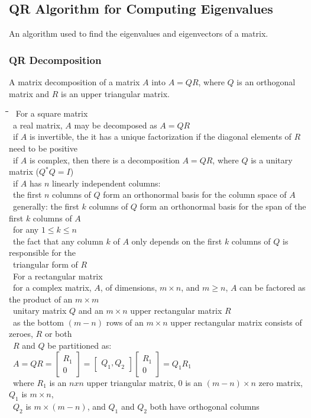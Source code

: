 \documentclass[10pt,letterpaper]{scrartcl}
\newcommand{\tbul}{\textbullet}
\newcommand{\tend}{\>\textendash}
\newcommand{\tasc}{\>\>\textasteriskcentered}
\newcommand{\tpec}{\>\>\>\textperiodcentered}
\newcommand{\tabDef}{\hspace{2em}\=\hspace{2em}\=\hspace{2em}\=\hspace{2em}\=\kill}
\begin{document}
\subsection{QR Algorithm for Computing Eigenvalues}
An algorithm used to find the eigenvalues and eigenvectors of a matrix.
\subsubsection{QR Decomposition}
A matrix decomposition of a matrix $A$ into $A=QR$, where $Q$ is an orthogonal matrix and $R$ is an upper triangular matrix.
\begin{tabbing}\tabDef 
\tbul\ For a square matrix \\
    \tend\ a real matrix, $A$ may be decomposed as $A=QR$\\
    \tend\ if $A$ is invertible, the it has a unique factorization if the diagonal elements of $R$ need to be positive \\
    \tend\ if $A$ is complex, then there is a decomposition $A=QR$, where $Q$ is a unitary matrix ($Q^*Q=I$) \\
    \tend\ if $A$ has $n$ linearly independent columns:\\
        \tasc\ the first $n$ columns of $Q$ form an orthonormal basis for the column space of $A$ \\
            \tpec\ generally: the first $k$ columns of $Q$ form an orthonormal basis for the span of the first $k$ columns of $A$ \\ \>\>\>\ for any $1\leq k\leq n$ \\
            \tpec\ the fact that any column $k$ of $A$ only depends on the first $k$ columns of $Q$ is responsible for the \\ \>\>\>\ triangular form of $R$ \\
\tbul\ For a rectangular matrix \\
    \tend\ for a complex matrix, $A$, of dimensions, $m\times n$, and $m\geq n$, $A$ can be factored as the product of an $m\times m$ \\ \>\ unitary matrix $Q$ and an $m\times n$ upper rectangular matrix $R$ \\
    \tend\ as the bottom $(m-n)$ rows of an $m\times n$ upper rectangular matrix consists of zeroes, $R$ or both \\ \>\ $R$ and $Q$ be partitioned as: \\ 
    \>\>\>\ $A = QR = \begin{bmatrix} R_1 \\ 0 \end{bmatrix} = \begin{bmatrix} Q_1, Q_2 \end{bmatrix} \begin{bmatrix} R_1 \\ 0 \end{bmatrix} = Q_1 R_1$  \\
    \>\>\ where $R_1$ is an $nxn$ upper triangular matrix, 0 is an $(m-n)\times n$ zero matrix, $Q_1$ is $m\times n$, \\ \>\>\ $Q_2$ is $m\times (m-n)$, and $Q_1$ and $Q_2$ both have orthogonal columns \\
\end{tabbing}
\end{document}
